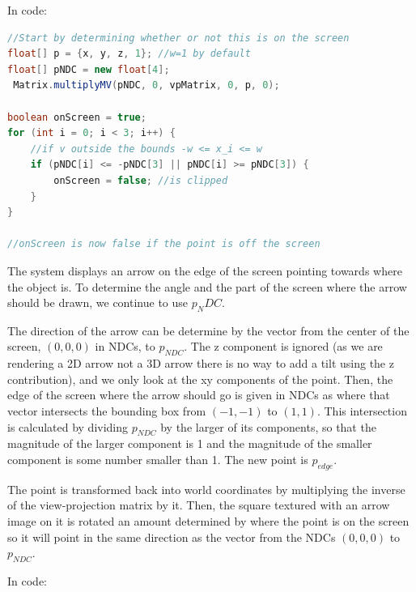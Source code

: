 In code:

\begin{lstlisting}[language=Java]
//Start by determining whether or not this is on the screen
float[] p = {x, y, z, 1}; //w=1 by default
float[] pNDC = new float[4];
 Matrix.multiplyMV(pNDC, 0, vpMatrix, 0, p, 0);

boolean onScreen = true;
for (int i = 0; i < 3; i++) {
	//if v outside the bounds -w <= x_i <= w
	if (pNDC[i] <= -pNDC[3] || pNDC[i] >= pNDC[3]) {
		onScreen = false; //is clipped
	}
}

//onScreen is now false if the point is off the screen
\end{lstlisting}

The system displays an arrow on the edge of the screen pointing towards where the object is. To determine the angle and the part of the screen where the arrow should be drawn, we continue to use $p_NDC$.

The direction of the arrow can be determine by the vector from the center of the screen, $(0, 0, 0)$ in NDCs, to $p_{NDC}$. The z component is ignored (as we are rendering a 2D arrow not a 3D arrow there is no way to add a tilt using the z contribution), and we only look at the xy components of the point. Then, the edge of the screen where the arrow should go is given in NDCs as where that vector intersects the bounding box from $(-1, -1)$ to $(1, 1)$. This intersection is calculated by dividing $p_{NDC}$ by the larger of its components, so that the magnitude of the larger component is 1 and the magnitude of the smaller component is some number smaller than 1. The new point is $p_{edge}$.

The point is transformed back into world coordinates by multiplying the inverse of the view-projection matrix by it. Then, the square textured with an arrow image on it is rotated an amount determined by where the point is on the screen so it will point in the same direction as the vector from the NDCs $(0, 0, 0)$ to $p_{NDC}$. 

In code:

